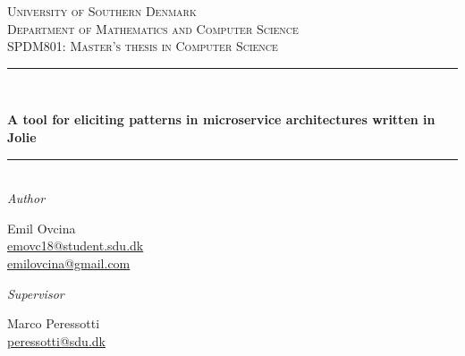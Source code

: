 \documentclass[oneside]{book}
\begin{document}
\begin{titlepage}

\newcommand{\HRule}{\rule{\linewidth}{0.5mm}}

\center %


	\textsc{\LARGE University of Southern Denmark}\\[1.5cm]

	\textsc{\Large Department of Mathematics and Computer Science}\\[0.5cm]

	\textsc{\large SPDM801: Master's thesis in Computer Science}\\[0.5cm]


	\HRule\\[0.5cm]

	\begin{spacing}{1.9}
		{\huge\bfseries A tool for eliciting patterns in microservice architectures written in Jolie}\\[0.0cm] %
	\end{spacing}

	\HRule\\[1.0cm]

	\large
	\textit{Author}\\ \bigskip
	\begin{minipage}[t]{0.45\textwidth}
	    \begin{center}
		    \normalsize
		    Emil Ovcina\\
		    \href{mailto:emovc18@student.sdu.dk}{emovc18@student.sdu.dk}\\
		    \href{mailto:emilovcina@gmail.com}{emilovcina@gmail.com}\\ \bigskip    
	   \end{center}
	\end{minipage}
    \vfill\vfill\vfill
    \large
	\textit{Supervisor}\\ \bigskip
	\begin{minipage}[t]{0.45\textwidth}
	    \begin{center}
		    \normalsize
		    Marco Peressotti\\
		    \href{mailto:peressotti@sdu.dk}{peressotti@sdu.dk}\\ \bigskip    
	   \end{center}
	\end{minipage}



\end{titlepage}
\end{document}
